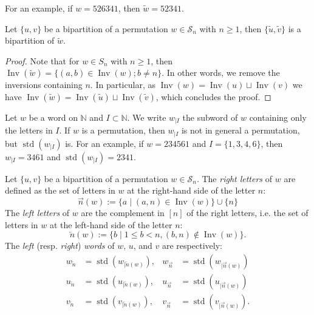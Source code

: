 \documentclass[ALCO,Unicode]{cedram}
\theoremstyle{definition}
\newcommand{\Sym}[1]{\mathcal{S}_{#1}}
\newcommand{\Symn}{\Sym{n}}
\newcommand{\NN}{\mathbb{N}}
\DeclareMathOperator{\std}{std}
\newcommand{\rest}[2]{#1_{|#2}}
\newcommand{\srest}[2]{\std(#1_{|#2})}
\DeclareMathOperator{\invs}{Inv}
\newcommand{\dec}[1]{\widetilde{#1}}
\newcommand{\R}{{\overrightarrow{n}}}
\newcommand{\LL}{{\overleftarrow{n}}}
\begin{document}
For an example, if $w = 526341$, then $\dec{w} = 52341$.

\begin{lemm}
\label{lem:dec}
Let $\lbrace u, v \rbrace$ be a bipartition of a permutation $w \in \Symn$ with $n \geq 1$, then $\lbrace \dec{u}, \dec{v} \rbrace$ is a bipartition of $\dec{w}$.
\end{lemm}

\begin{proof}
Note that for $w \in S_n$ with $n \geq 1$, then $\invs(\dec{w}) = \lbrace (a,b) \in \invs(w); b \neq n \rbrace$. In other words, we remove the inversions containing $n$. In particular, as $\invs(w) = \invs(u) \sqcup \invs(v)$ we have $\invs(\dec{w}) = \invs(\dec{u}) \sqcup \invs(\dec{v})$, which concludes the proof.
\end{proof}


Let $w$ be a word on $\NN$ and $I \subset \NN$. We write $\rest{w}{I}$ the subword of $w$ containing only the letters in $I$. If $w$ is a permutation, then $\rest{w}{I}$ is not in general a permutation, but $\srest{w}{I}$ is. For an example, if $w = 234561$ and $I = \lbrace 1, 3, 4, 6 \rbrace$, then $\rest{w}{I} = 3461$ and $\srest{w}{I} = 2341$.


\begin{defi}
\label{def:decomp}
Let $\lbrace u, v \rbrace$ be a bipartition of a permutation $w \in \Symn$. The \emph{right letters} of $w$ are defined as the set of letters in $w$ at the right-hand side of the letter $n$:
\begin{equation*}
\R (w) := \lbrace a\mid (a,n) \in \invs(w) \rbrace \cup \lbrace n \rbrace
\end{equation*}
The \emph{left letters} of $w$ are the complement in $[n]$ of the right letters, i.e. the set of letters in $w$ at the left-hand side of the letter $n$:
\begin{equation*}
\LL(w) := \lbrace b\mid 1 \leq b < n, (b,n) \not\in \invs(w) \rbrace.
\end{equation*}
The {\em left} (resp. {\em right}) {\em words} of $w$, $u$, and $v$ are respectively:
\begin{align*}
w_\LL &= \srest{w}{\LL(w)}, & w_\R &= \srest{w}{\R(w)} \\
u_\LL &= \srest{u}{\LL(w)}, & u_\R &= \srest{u}{\R(w)} \\
v_\LL &= \srest{v}{\LL(w)}, & v_\R &= \srest{v}{\R(w)}. 
\end{align*}
\end{defi}
\end{document}

